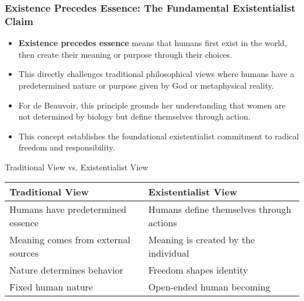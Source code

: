 \documentclass[aspectratio=169]{beamer}
\begin{document}
	\begin{frame}
		\frametitle{Existence Precedes Essence: The Fundamental Existentialist Claim}
		\begin{itemize}
			\item \textbf{Existence precedes essence} means that humans first exist in the world, then create their meaning or purpose through their choices.
			\item This directly challenges traditional philosophical views where humans have a predetermined nature or purpose given by God or metaphysical reality.
			\item For de Beauvoir, this principle grounds her understanding that women are not determined by biology but define themselves through action.
			\item This concept establishes the foundational existentialist commitment to radical freedom and responsibility.
		\end{itemize}
		
		\begin{block}{Traditional View vs. Existentialist View}
			\begin{tabular}{p{} | p{}}
				\textbf{Traditional View} & \textbf{Existentialist View} \\
				\hline
				Humans have predetermined essence & Humans define themselves through actions \\
				Meaning comes from external sources & Meaning is created by the individual \\
				Nature determines behavior & Freedom shapes identity \\
				Fixed human nature & Open-ended human becoming \\
			\end{tabular}
		\end{block}
	\end{frame}
	
\end{document}
